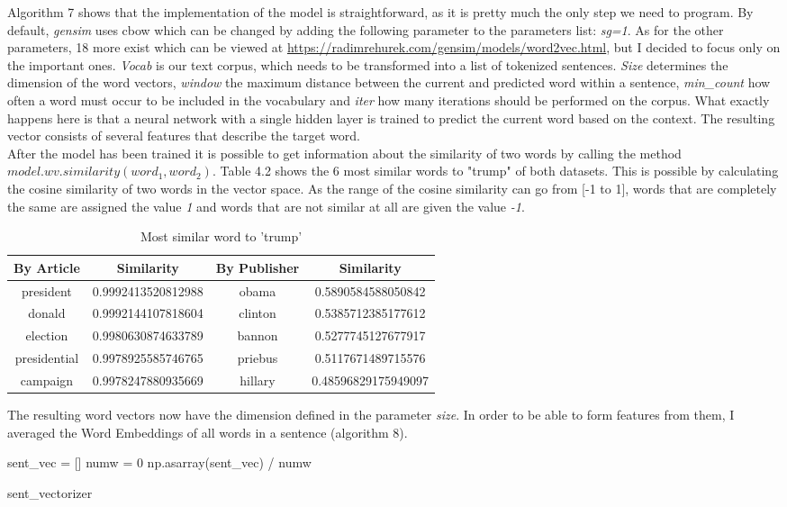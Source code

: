 \documentclass[a4paper, 11pt,titlepage,oneside,openany]{book}
\begin{document}
\noindent Algorithm 7 shows that the implementation of the model is straightforward, as it is pretty much the only step we need to program. By default, \textit{gensim} uses \gls{cbow} which can be  changed  by adding the following parameter to the parameters list: \textit{sg=1}. As for the other parameters, 18 more exist which can be viewed at \url{https://radimrehurek.com/gensim/models/word2vec.html}, but I decided to focus only on the important ones. \textit{Vocab} is our text corpus, which needs to be transformed into a list of tokenized sentences. \textit{Size} determines the dimension of the word vectors, \textit{window} the maximum distance between the current and predicted word within a sentence, \textit{min\_count}  how often a word must occur to be included in the vocabulary and \textit{iter} how many iterations  should be performed on the corpus. What exactly happens here is that a neural network with a single hidden layer is trained to predict the current word based on the context. The resulting vector consists of several features that describe the target word.\\
\noindent 
After the model has been trained it is possible to get information about the similarity of two words by calling the method $model.wv.similarity(word_1, word_2)$. Table 4.2 shows the 6 most similar words to "trump" of both datasets. This is possible by calculating the cosine similarity of two words in the vector space. As the range of the cosine similarity can go from [-1 to 1], words that are completely the same are assigned the value \textit{1} and words that are not similar at all are given the value \textit{-1}. \\
\begin{table}[t]
	\scriptsize
	\centering
		\begin{tabular}{cc|cc}
			\toprule
			By Article & Similarity  & By Publisher & Similarity \\
			\midrule
			president & 0.9992413520812988 & obama & 0.5890584588050842 \\
			donald & 0.9992144107818604 & clinton & 0.5385712385177612 \\
			election & 0.9980630874633789 & bannon & 0.5277745127677917 \\
			presidential & 0.9978925585746765 & priebus & 0.5117671489715576 \\
			campaign & 0.9978247880935669 & hillary &  0.48596829175949097 \\
			\bottomrule
		\end{tabular}
		\caption{Most similar word to 'trump'}
\end{table}
\noindent The resulting word vectors now have the dimension defined in the parameter \textit{size}. In order to be able to form features from them, I averaged the Word Embeddings of all words in a sentence (algorithm 8).\\
\begin{algorithm}[H]
	\DontPrintSemicolon
	sent\_vec = [] \;
	numw =  0 \;
	\Return np.asarray(sent\_vec) / numw
	\caption{sent\_vectorizer}
\end{algorithm}
\end{document}
